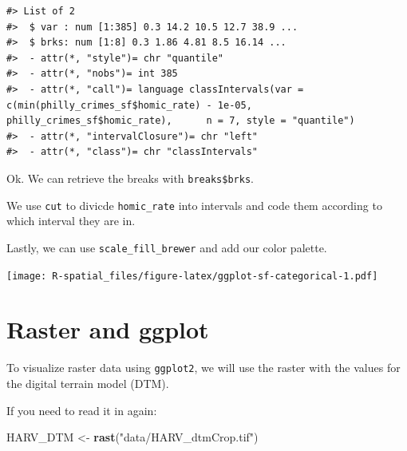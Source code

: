 \documentclass[
]{book}
\newenvironment{Shaded}{\begin{snugshade}}{\end{snugshade}}
\newcommand{\AttributeTok}[1]{\textcolor[rgb]{0.13,0.29,0.53}{#1}}
\newcommand{\FunctionTok}[1]{\textcolor[rgb]{0.13,0.29,0.53}{\textbf{#1}}}
\newcommand{\NormalTok}[1]{#1}
\newcommand{\OtherTok}[1]{\textcolor[rgb]{0.56,0.35,0.01}{#1}}
\newcommand{\SpecialCharTok}[1]{\textcolor[rgb]{0.81,0.36,0.00}{\textbf{#1}}}
\newcommand{\StringTok}[1]{\textcolor[rgb]{0.31,0.60,0.02}{#1}}
\begin{document}
\begin{verbatim}
#> List of 2
#>  $ var : num [1:385] 0.3 14.2 10.5 12.7 38.9 ...
#>  $ brks: num [1:8] 0.3 1.86 4.81 8.5 16.14 ...
#>  - attr(*, "style")= chr "quantile"
#>  - attr(*, "nobs")= int 385
#>  - attr(*, "call")= language classIntervals(var = c(min(philly_crimes_sf$homic_rate) - 1e-05, philly_crimes_sf$homic_rate),      n = 7, style = "quantile")
#>  - attr(*, "intervalClosure")= chr "left"
#>  - attr(*, "class")= chr "classIntervals"
\end{verbatim}

Ok. We can retrieve the breaks with \texttt{breaks\$brks}.

We use \texttt{cut} to divicde \texttt{homic\_rate} into intervals and code them according to which interval they are in.

Lastly, we can use \texttt{scale\_fill\_brewer} and add our color palette.

\begin{Shaded}
\end{Shaded}

\texttt{[image: R-spatial\_files/figure-latex/ggplot-sf-categorical-1.pdf]}

\hypertarget{raster-and-ggplot}{%
\section{Raster and ggplot}\label{raster-and-ggplot}}

To visualize raster data using \texttt{ggplot2}, we will use the raster with the values for the digital terrain model (DTM).

If you need to read it in again:

\begin{Shaded}
\begin{Highlighting}[]
\NormalTok{HARV\_DTM }\OtherTok{\textless{}{-}} \FunctionTok{rast}\NormalTok{(}\StringTok{"data/HARV\_dtmCrop.tif"}\NormalTok{)}
\end{Highlighting}
\end{Shaded}
\end{document}
